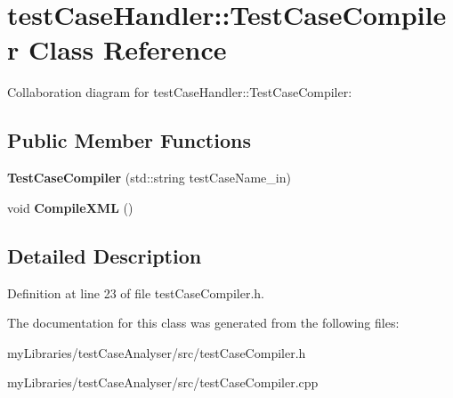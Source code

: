 \hypertarget{classtestCaseHandler_1_1TestCaseCompiler}{}\section{test\+Case\+Handler\+::Test\+Case\+Compiler Class Reference}
\label{classtestCaseHandler_1_1TestCaseCompiler}


Collaboration diagram for test\+Case\+Handler\+::Test\+Case\+Compiler\+:
\subsection*{Public Member Functions}
\begin{DoxyCompactItemize}
\item 
\mbox{\label{classtestCaseHandler_1_1TestCaseCompiler_ab51d1f99f9038e1aa104dbc791b998a6}} 
{\bfseries Test\+Case\+Compiler} (std\+::string test\+Case\+Name\+\_\+in)
\item 
\mbox{\label{classtestCaseHandler_1_1TestCaseCompiler_a0530f6aa00442c6353b7a49b2bed5ffb}} 
void {\bfseries Compile\+X\+ML} ()
\end{DoxyCompactItemize}


\subsection{Detailed Description}


Definition at line 23 of file test\+Case\+Compiler.\+h.



The documentation for this class was generated from the following files\+:\begin{DoxyCompactItemize}
\item 
my\+Libraries/test\+Case\+Analyser/src/test\+Case\+Compiler.\+h\item 
my\+Libraries/test\+Case\+Analyser/src/test\+Case\+Compiler.\+cpp\end{DoxyCompactItemize}
